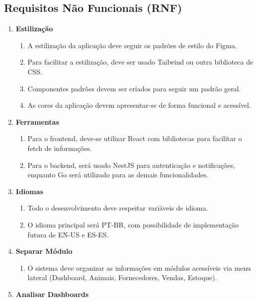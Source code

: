 \documentclass[12pt, a4paper]{article}
\begin{document}
\begin{spacing}{1.5}
\subsection{Requisitos Não Funcionais (RNF)}
\begin{spacing}{1.5}
\begin{enumerate}[label=RNF0\arabic{*}.]
    \item \textbf{Estilização}
    \begin{enumerate}[label=RNF01.0\arabic{*}]
        \item A estilização da aplicação deve seguir os padrões de estilo do Figma.
        \item Para facilitar a estilização, deve ser usado Tailwind ou outra biblioteca de CSS.
        \item Componentes padrões devem ser criados para seguir um padrão geral.
        \item As cores da aplicação devem apresentar-se de forma funcional e acessível.
    \end{enumerate}
    \item \textbf{Ferramentas}
    \begin{enumerate}[label=RNF02.0\arabic{*}]
        \item Para o frontend, deve-se utilizar React com bibliotecas para facilitar o fetch de informações.
        \item Para o backend, será usado NestJS para autenticação e notificações, enquanto Go será utilizado para as demais funcionalidades.
    \end{enumerate}
    \item \textbf{Idiomas}
    \begin{enumerate}[label=RNF03.0\arabic{*}]
        \item Todo o desenvolvimento deve respeitar variáveis de idioma.
        \item O idioma principal será PT-BR, com possibilidade de implementação futura de EN-US e ES-ES.
    \end{enumerate}
    \item \textbf{Separar Módulo}
    \begin{enumerate}[label=RF04.0\arabic{*}]
        \item O sistema deve organizar as informações em módulos acessíveis via menu lateral (Dashboard, Animais, Fornecedores, Vendas, Estoque).
    \end{enumerate}
    \item \textbf{Analisar Dashboards}
    \begin{enumerate}[label=RF05.0\arabic{*}]

\end{enumerate}
\end{enumerate}
\end{spacing}
\end{spacing}
\end{document}
